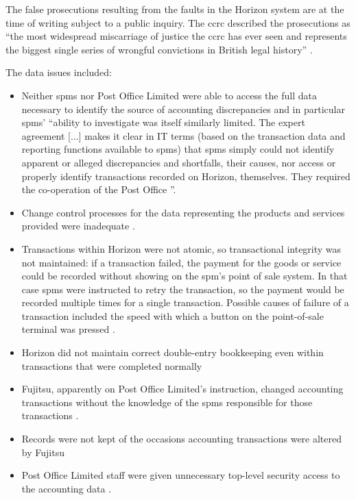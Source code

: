 The false prosecutions resulting from the faults in the Horizon system are at the time of writing subject to a public inquiry. The \gls{ccrc} described the prosecutions as ``the most widespread miscarriage of justice the \gls{ccrc} has ever seen and represents the biggest single series of wrongful convictions in British legal history''  \cite{citation:horizon_ccrc}.

The data issues included:
\begin{itemize}
	\item Neither \glspl{spm} nor Post Office Limited were able to access the full data necessary to identify the source of accounting discrepancies \cite[]{citation:bates_v_pol} and in particular \glspl{spm}' ``ability to
	investigate was itself similarly limited. The expert agreement [...]
	makes it clear in IT terms (based on the transaction data and reporting functions
	available to \glspl{spm}) that \glspl{spm} simply could not identify apparent or alleged
	discrepancies and shortfalls, their causes, nor access or properly identify transactions
	recorded on Horizon, themselves. They required the co-operation of the Post Office \cite[]{citation:bates_v_pol}''.
	\item Change control processes for the data representing the products and services provided were inadequate \cite[]{citation:bates_v_pol_tech}.
	\item Transactions within Horizon were not atomic, so transactional \gls{integrity} was not maintained: if a transaction failed, the payment for the goods or service could be recorded without showing on the \gls{spm}'s point of sale system. In that case \glspl{spm} were instructed to retry the transaction, so the payment would be recorded multiple times for a single transaction. Possible causes of failure of a transaction included the speed with which a button on the point-of-sale terminal was pressed \cite[]{citation:bates_v_pol}.
	\item Horizon did not maintain correct double-entry bookkeeping even within transactions that were completed normally \cite[\textsection 128ff]{citation:bates_v_pol_tech}
	\item Fujitsu, apparently on Post Office Limited's instruction, changed accounting transactions without the knowledge of the \glspl{spm} responsible for those transactions \cite[]{citation:bates_v_pol_tech}.
	\item Records were not kept of the occasions accounting transactions were altered by Fujitsu \cite[, ]{citation:bates_v_pol}
	\item Post Office Limited staff were given unnecessary top-level security access to the accounting data \cite[]{citation:bates_v_pol}.
\end{itemize}
